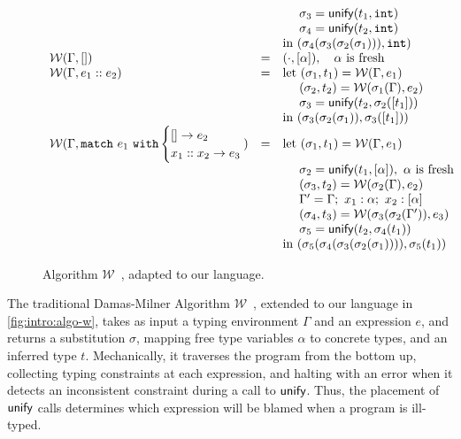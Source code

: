 \begin{figure}
\[{\begin{array}{lcl}
   &   & \quad\ \sigma_3 = \unify{t_1}{\tint} \\
   &   & \quad\ \sigma_4 = \unify{t_2}{\tint} \\
   &   & \text{in } (\sigma_4(\sigma_3(\sigma_2(\sigma_1))), \tint) \\
\W(\Gamma, \enil)
   & = & (\cdot, \tlist{\alpha}), \quad \alpha \text{ is fresh} \\
\W(\Gamma, \econs{e_1}{e_2})
   & = & \text{let } (\sigma_1, t_1) = \W(\Gamma, e_1) \\
   &   & \quad\ (\sigma_2, t_2) = \W(\sigma_1(\Gamma), e_2) \\
   &   & \quad\ \sigma_3 = \unify{t_2}{\sigma_2(\tlist{t_1})} \\
   &   & \text{in } (\sigma_3(\sigma_2(\sigma_1)), \sigma_3(\tlist{t_1})) \\
\W(\Gamma, \elcase{e_1}{e_2}{x_1}{x_2}{e_3}\hspace{-2ex})
   & = & \text{let } (\sigma_1, t_1) = \W(\Gamma, e_1) \\
   &   & \quad\ \sigma_2 = \unify{t_1}{\tlist{\alpha}},\ \alpha \text{ is fresh} \\
   &   & \quad\ (\sigma_3, t_2) = \W(\sigma_2(\Gamma), e_2) \\
   &   & \quad\ \Gamma' = \Gamma;\ x_1:\alpha;\ x_2:\tlist{\alpha} \\
   &   & \quad\ (\sigma_4, t_3) = \W(\sigma_3(\sigma_2(\Gamma')), e_3) \\
   &   & \quad\ \sigma_5 = \unify{t_2}{\sigma_4(t_1)} \\
   &   & \text{in } (\sigma_5(\sigma_4(\sigma_3(\sigma_2(\sigma_1)))), \sigma_5(t_1)) \\
\end{array}
}
\]
\caption{Algorithm $\mathcal{W}$~\citep{Damas1982-uw}, adapted to our language. }
\label{fig:intro:algo-w}
\end{figure}

The traditional Damas-Milner Algorithm
$\mathcal{W}$~\citep{Damas1982-uw}, extended to our language in
\autoref{fig:intro:algo-w}, takes as input a typing environment $\Gamma$
and an expression $e$, and returns a substitution $\sigma$, mapping free
type variables $\alpha$ to concrete types, and an inferred type $t$.
%
Mechanically, it traverses the program from the bottom up, collecting
typing constraints at each expression, and halting with an error when it
detects an inconsistent constraint during a call to
$\mathsf{unify}$. 
%
Thus, the placement of $\mathsf{unify}$ calls determines which expression will be blamed when a program is ill-typed.

